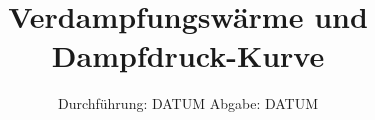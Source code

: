 

\subject{VERSUCH NUMMER 203}
\title{Verdampfungswärme und Dampfdruck-Kurve}
\date{
  Durchführung: DATUM
  \hspace{3em}
  Abgabe: DATUM
}



\maketitle
\thispagestyle{empty}
\tableofcontents
\newpage
\setcounter{page}{1}







\newpage
\printbibliography
\nocite{ap308}
\nocite{matplotlib}
\nocite{numpy}
\nocite{scipy}
\nocite{uncertainties}
\nocite{reback2020pandas}
\nocite{coherent}

\newpage
%
%


